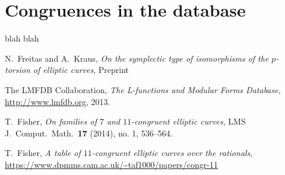 \documentclass[12pt]{amsart}
\numberwithin{equation}{section}
\theoremstyle{definition}
\theoremstyle{remark}
\begin{document}
\section{Congruences in the database}

blah blah


 
\begin{thebibliography}{999}


 N.\ Freitas and A.\ Kraus,
{\em On the symplectic type of isomorphisms of the $p$-torsion of elliptic curves}, Preprint

 The {LMFDB Collaboration},
{\em The L-functions and Modular Forms Database}, \\
\url{http://www.lmfdb.org}, 2013.

 T.\ Fisher,
{\em On families of $7$ and $11$-congruent elliptic curves}, 
LMS J.\ Comput.\ Math.\ {\bf 17} (2014), no. 1, 536--564.

 T.\ Fisher,
{\em A table of $11$-congruent elliptic curves over the rationals}, \\
\url{https://www.dpmms.cam.ac.uk/~taf1000/papers/congr-11}

\begin{comment}
 
\bibitem{AnniSiksek} S.\ Anni and S.\ Siksek,
{\em Modular elliptic curves over real abelian fields and the generalized {F}ermat equation $x^{2\ell} + y^{2m}=z^p$}, Algebra \& Number Theory {\bf 10} (2016), no.6, 1147--1172


\bibitem{BennetSkinner} M.\ A.\ Bennett and C.\ M.\ Skinner,
{\em Ternary Diophantine equations via Galois representations and modular forms}, Canad.\ J.\ Math.\ {\bf 56} (2004), no. 1, 23--54.
 


\bibitem{programs} N. Billerey, I. Chen, L. Demb\'el\'e, L. Dieulefait, and N. Freitas, 
{\em Supporting {{\tt Magma}} program files for this paper},
\url{http://math.univ-bpclermont.fr/~billerey/Research/BCDDF/}


\end{comment}
\end{thebibliography}
\end{document}
